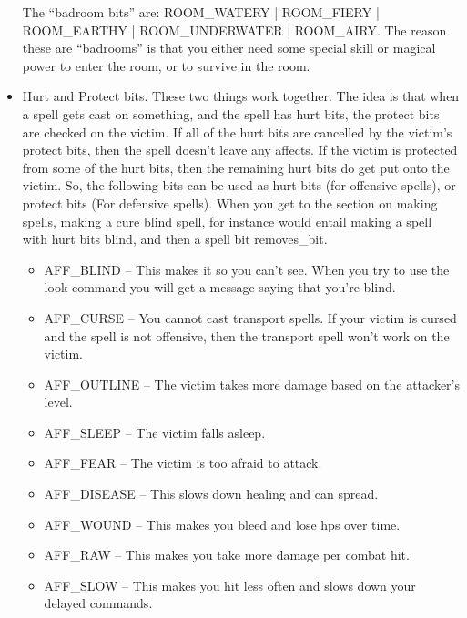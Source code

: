 \begin{itemize}
\begin{itemize}
\end{itemize}

The ``badroom bits'' are: ROOM\_WATERY | ROOM\_FIERY | ROOM\_EARTHY | ROOM\_UNDERWATER | ROOM\_AIRY. The reason these are ``badrooms'' is that you either need some special skill or magical power to enter the room, or to survive in the room.

\item Hurt and Protect bits. These two things work together. The idea
is that when a spell gets cast on something, and the spell has hurt
bits, the protect bits are checked on the victim. If all of the hurt
bits are cancelled by the victim's protect bits, then the spell
doesn't leave any affects. If the victim is protected from some of the
hurt bits, then the remaining hurt bits do get put onto the
victim. So, the following bits can be used as hurt bits (for offensive
spells), or protect bits (For defensive spells). When you get to the
section on making spells, making a cure blind spell, for instance
would entail making a spell with hurt bits blind, and then a spell bit
removes\_bit.

\begin{itemize}

\item AFF\_BLIND -- This makes it so you can't see. When you try to use the look command you will get a message saying that you're blind.

\item AFF\_CURSE -- You cannot cast transport spells. If your victim is cursed and the spell is not offensive, then the transport spell won't work on the victim.

\item AFF\_OUTLINE -- The victim takes more damage based on the attacker's level.

\item AFF\_SLEEP -- The victim falls asleep.

\item AFF\_FEAR -- The victim is too afraid to attack.

\item AFF\_DISEASE -- This slows down healing and can spread.

\item AFF\_WOUND -- This makes you bleed and lose hps over time.

\item AFF\_RAW -- This makes you take more damage per combat hit.

\item AFF\_SLOW -- This makes you hit less often and slows down your delayed commands.


\end{itemize}
\end{itemize}
